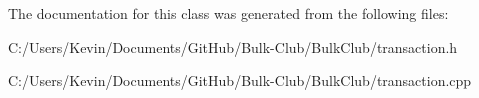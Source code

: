 The documentation for this class was generated from the following files\+:\begin{DoxyCompactItemize}
\item 
C\+:/\+Users/\+Kevin/\+Documents/\+Git\+Hub/\+Bulk-\/\+Club/\+Bulk\+Club/transaction.\+h\item 
C\+:/\+Users/\+Kevin/\+Documents/\+Git\+Hub/\+Bulk-\/\+Club/\+Bulk\+Club/transaction.\+cpp\end{DoxyCompactItemize}
